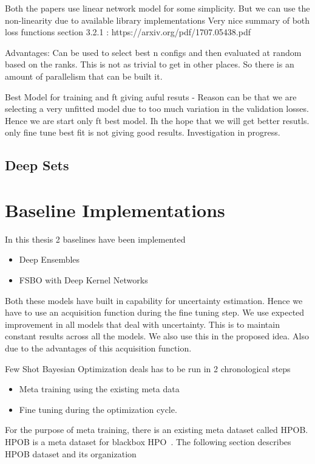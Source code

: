 \documentclass[11pt]{report}
\begin{document}
    Both the papers use linear network model for some simplicity. But we can use the non-linearity due to available library
        implementations
    Very nice summary of both loss functions section 3.2.1 : https://arxiv.org/pdf/1707.05438.pdf 

Advantages:
    Can be used to select best n configs and then evaluated at random based on the ranks. This is not as trivial to get in other
    places. So there is an amount of parallelism that can be built it.

Best Model for training and ft giving auful resuts - Reason can be that we are selecting a very unfitted model due to too much variation in the validation losses.
Hence we are start only ft best model. Ih the hope that we will get better resutls.
only fine tune best fit is not giving good results. Investigation in progress. 

\fi

\section{Deep Sets}


\chapter{Baseline Implementations}


In this thesis 2 baselines have been implemented
\begin{itemize}
\item Deep Ensembles
\item FSBO with Deep Kernel Networks
\end{itemize}

Both these models have built in capability for uncertainty estimation.
Hence we have to use an acquisition function during the fine tuning step.
We use expected improvement in all models that deal with uncertainty.
This is to maintain constant results across all the models.
We also use this in the proposed idea.
Also due to the advantages of this acquisition function.

Few Shot Bayesian Optimization deals has to be run in 2 chronological steps
\begin{itemize}
\item Meta training using the existing meta data
\item Fine tuning during the optimization cycle.
\end{itemize}

For the purpose of meta training,  there is an existing meta dataset called HPOB.
HPOB is a meta dataset for blackbox HPO~\cite{pineda2021hpob}.
The following section describes HPOB dataset and its organization
\end{document}
